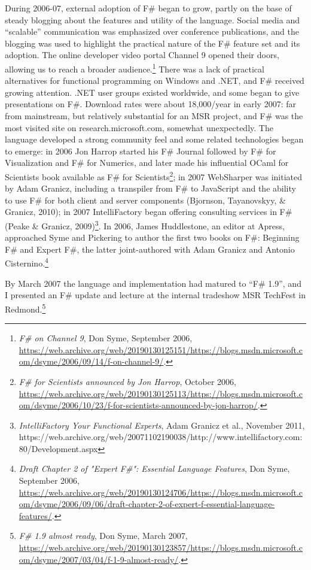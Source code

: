 \documentclass[acmsmall,review]{acmart}\settopmatter{printfolios=true,printccs=false,printacmref=false}
\begin{document}
During 2006-07, external adoption of F\# began to grow, partly on the base of steady blogging about the features and utility of the language.
Social media and “scalable” communication was emphasized over conference publications, and the blogging was used to highlight the practical
nature of the F\# feature set and its adoption. The online developer video portal Channel 9 opened their doors, allowing us to reach a broader
audience.\footnote{\textit{F\# on Channel 9}, Don Syme, September 2006, \url{https://web.archive.org/web/20190130125151/https://blogs.msdn.microsoft.com/dsyme/2006/09/14/f-on-channel-9/}.}
There was a lack of practical alternatives for functional programming on Windows and .NET, and F\# received growing attention.
.NET user groups existed worldwide, and some began to give presentations on F\#. Download rates were about 18,000/year in early 2007:
far from mainstream, but relatively substantial for an MSR project, and F\# was the most visited site on research.microsoft.com, somewhat
unexpectedly. The language developed a strong community feel and some related technologies began to emerge: in 2006 Jon Harrop started
his F\# Journal followed by F\# for Visualization and F\# for Numerics, and later made his influential OCaml for Scientists book available
as F\# for Scientists\footnote{ \textit{F\# for Scientists announced by Jon Harrop}, October 2006, \url{https://web.archive.org/web/20190130125113/https://blogs.msdn.microsoft.com/dsyme/2006/10/23/f-for-scientists-announced-by-jon-harrop/}.}; in 2007 WebSharper was initiated by Adam Granicz, including a
transpiler from F\# to JavaScript and the ability to use F\# for both client and server
components (Bjornson, Tayanovskyy, \& Granicz, 2010); in 2007 IntelliFactory began offering consulting services
in F\# (Peake \& Granicz, 2009)\footnote{\textit{IntelliFactory Your Functional Experts}, Adam Granicz et al., November 2011, https://web.archive.org/web/20071102190038/http://www.intellifactory.com:80/Development.aspx}.
In 2006, James Huddlestone, an editor at Apress, approached Syme and Pickering to author the first two
books on F\#: Beginning F\# and Expert F\#, the latter joint-authored with Adam Granicz and Antonio Cisternino.\footnote{\textit{Draft Chapter 2 of "Expert F\#": Essential Language Features}, Don Syme, September 2006, \url{https://web.archive.org/web/20190130124706/https://blogs.msdn.microsoft.com/dsyme/2006/09/06/draft-chapter-2-of-expert-f-essential-language-features/}.}

By March 2007 the language and implementation had matured to “F\# 1.9”, and I presented an F\# update and lecture at the internal tradeshow MSR TechFest in Redmond.\footnote{\textit{F\# 1.9 almost ready}, Don Syme, March 2007, \url{https://web.archive.org/web/20190130123857/https://blogs.msdn.microsoft.com/dsyme/2007/03/04/f-1-9-almost-ready/}.}
\end{document}

